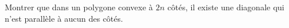 Montrer que dans un polygone convexe à $2n$ côtés, il existe une diagonale qui n'est parallèle à aucun des côtés.

